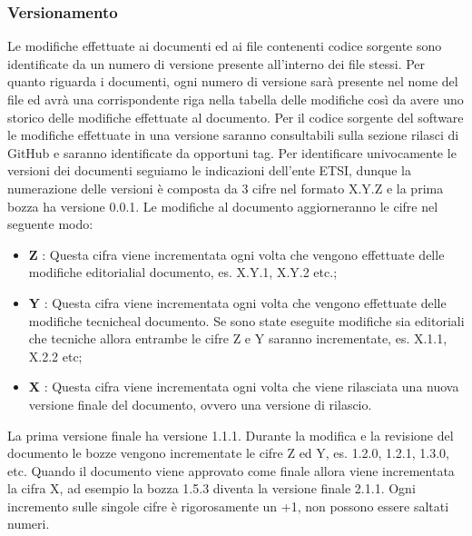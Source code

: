 	\subsubsection{Versionamento}
		Le modifiche effettuate ai documenti ed ai file contenenti codice sorgente sono identificate da un numero di versione presente all'interno dei file stessi. Per quanto riguarda i documenti, ogni numero di versione sarà presente nel nome del file ed avrà una corrispondente riga nella tabella delle modifiche così da avere uno storico delle modifiche effettuate al documento. Per il codice sorgente del software le modifiche effettuate in una versione saranno consultabili sulla sezione rilasci di GitHub e saranno identificate da opportuni tag.
		\newline
		Per identificare univocamente le versioni dei documenti seguiamo le indicazioni dell'ente ETSI, dunque la numerazione delle versioni è composta da 3 cifre nel formato X.Y.Z e la prima bozza ha versione 0.0.1. Le modifiche al documento aggiorneranno le cifre nel seguente modo:
		\begin{itemize}
			\item \textbf{Z} : Questa cifra viene incrementata ogni volta che vengono effettuate delle modifiche editoriali\glosp al documento, es. X.Y.1, X.Y.2 etc.;
			\item \textbf{Y} : Questa cifra viene incrementata ogni volta che vengono effettuate delle modifiche tecniche\glosp al documento. Se sono state eseguite modifiche sia editoriali che tecniche allora entrambe le cifre Z e Y saranno incrementate, es. X.1.1, X.2.2 etc;
			\item \textbf{X} : Questa cifra viene incrementata ogni volta che viene rilasciata una nuova versione finale del documento, ovvero una versione di rilascio.			
		\end{itemize}
		La prima versione finale ha versione 1.1.1.
		\newline
		Durante la modifica e la revisione del documento le bozze vengono incrementate le cifre Z ed Y, es. 1.2.0, 1.2.1, 1.3.0, etc.
		\newline
		Quando il documento viene approvato come finale allora viene incrementata la cifra X, ad esempio la bozza 1.5.3 diventa la versione finale 2.1.1.
		\newline
		Ogni incremento sulle singole cifre è rigorosamente un +1, non possono essere saltati numeri.
		

